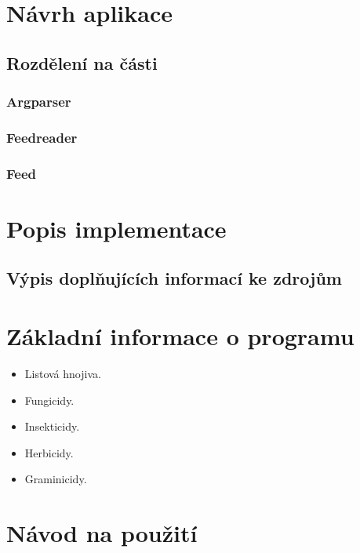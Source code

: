 \documentclass[11pt,a4paper,titlepage]{article}
\begin{document}
\section{Návrh aplikace}
\subsection{Rozdělení na části}
\subsubsection{Argparser}
\subsubsection{Feedreader}
\subsubsection{Feed}


\section{Popis implementace}
\subsection{Výpis doplňujících informací ke zdrojům}


\section{Základní informace o programu}

\begin{itemize}
  \item Listová hnojiva.
  \item Fungicidy.
  \item Insekticidy.
  \item Herbicidy.
  \item Graminicidy.\cite{Ar_Information}
\end{itemize}


\section{Návod na použití}


\newpage

\end{document}
